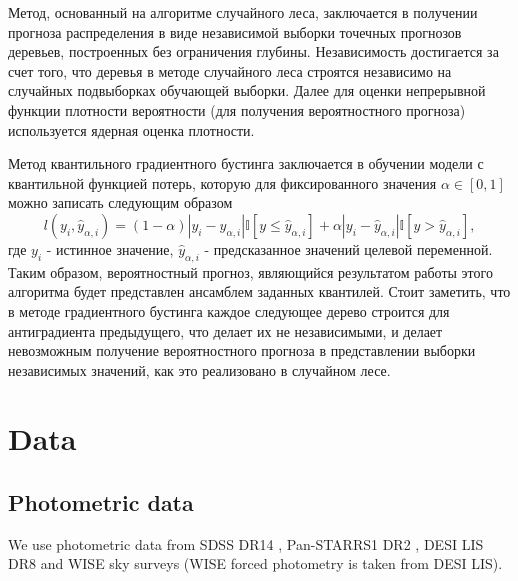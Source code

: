 \documentclass[fleqn,usenatbib]{mnras}
\begin{document}
Метод, основанный на алгоритме случайного леса, заключается в получении прогноза распределения в виде независимой выборки точечных прогнозов деревьев, построенных без ограничения глубины. Независимость достигается за счет того, что деревья в методе случайного леса строятся независимо на случайных подвыборках обучающей выборки. Далее для оценки непрерывной функции плотности вероятности (для получения вероятностного прогноза) используется ядерная оценка плотности.

Метод квантильного градиентного бустинга заключается в обучении модели с квантильной функцией потерь, которую для фиксированного значения \(\alpha \in [0,1]\) можно записать следующим образом
\begin{equation}
    l(y_i, \hat{y}_{\alpha, i}) = (1-\alpha)|y_i - \hat{y}_{\alpha, i}|\mathbb{I}[y \leq \hat{y}_{\alpha, i}] + \alpha|y_i - \hat{y}_{\alpha, i}|\mathbb{I}[y > \hat{y}_{\alpha, i}],
\end{equation}
где \(y_i\) - истинное значение, \(\hat{y}_{\alpha, i}\) - предсказанное значений целевой переменной. Таким образом, вероятностный прогноз, являющийся результатом работы этого алгоритма будет представлен ансамблем заданных квантилей. Стоит заметить, что в методе градиентного бустинга каждое следующее дерево строится для антиградиента предыдущего, что делает их не независимыми, и делает невозможным получение вероятностного прогноза в представлении выборки независимых значений, как это реализовано в случайном лесе.


\section{Data}
\subsection{Photometric data}
We use photometric data from SDSS DR14 \citep{2018ApJS..235...42A}, Pan-STARRS1 DR2 \citep{2018AAS...23110201C}, DESI LIS DR8 \citep{2019AJ....157..168D} and WISE \citep{2010AJ....140.1868W} sky surveys (WISE forced photometry is taken from DESI LIS).
\end{document}
